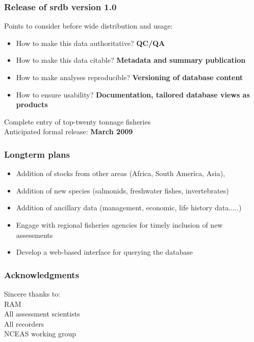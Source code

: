 \begin{frame}
\frametitle{Release of srdb version 1.0}
Points to consider before wide distribution and usage:
\begin{itemize}
 \item How to make this data authoritative? {\bf QC/QA}
 \item How to make this data citable? {\bf Metadata and summary publication}
 \item How to make analyses reproducible? {\bf Versioning of database content}
 \item How to ensure usability? {\bf Documentation, tailored database views as products}
\end{itemize}
\vspace{.25cm}
Complete entry of top-twenty tonnage fisheries\\
\vspace{.25cm}
Anticipated formal release: {\bf March 2009}\\
\end{frame}
\begin{frame}
\frametitle{Longterm plans}
\begin{itemize}
\item Addition of stocks from other areas (Africa, South America, Asia), 
\item Addition of new species (salmonids, freshwater fishes, invertebrates)
\item Addition of ancillary data (management, economic, life history data.....)
\item Engage with regional fisheries agencies for timely inclusion of new assessments 
\item Develop a web-based interface for querying the database
\end{itemize}
\end{frame}

\begin{frame}
\frametitle{Acknowledgments}
Sincere thanks to:\\
\vspace{.5cm}
RAM \\
All assessment scientists\\ 
All recorders\\
NCEAS working group
\end{frame}

